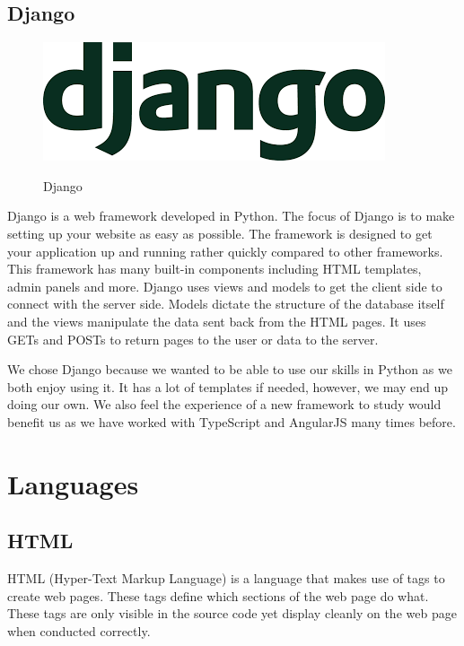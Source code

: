 \subsection{Django}
\begin{figure}
\includegraphics[scale=0.35]{img/django.png}
\caption{Django}
\cite{fullstackpython}
\end{figure}
Django is a web framework developed in Python. The focus of Django is to make setting up your website as easy as possible. The framework is designed to get your application up and running rather quickly compared to other frameworks. This framework has many built-in components including HTML templates, admin panels and more. 
Django uses views and models to get the client side to connect with the server side. Models dictate the structure of the database itself and the views manipulate the data sent back from the HTML pages. It uses GETs and POSTs to return pages to the user or data to the server\cite{pythonforbeginners}.

We chose Django because we wanted to be able to use our skills in Python as we both enjoy using it. It has a lot of templates if needed, however, we may end up doing our own. We also feel the experience of a new framework to study would benefit us as we have worked with TypeScript and AngularJS many times before.

\section{Languages}
\subsection{HTML}
HTML (Hyper-Text Markup Language) is a language that makes use of tags to create web pages. These tags define which sections of the web page do what. These tags are only visible in the source code yet display cleanly on the web page when conducted correctly.

